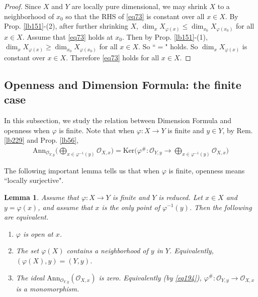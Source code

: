 \documentclass[12pt,b5paper,notitlepage]{report}
\theoremstyle{definition}
\theoremstyle{plain}
\newtheorem{lm}[df]{Lemma}
\newcommand{\scr}{\mathscr}
\newcommand{\Ker}{\mathrm{Ker}}
\newcommand{\Ann}{\mathrm{Ann}}
\numberwithin{equation}{section}
\begin{document}
\begin{proof}
Since $X$ and $Y$ are locally pure dimensional, we may shrink $X$ to a neighborhood of $x_0$ so that the RHS of \eqref{eq73} is constant over all $x\in X$. By Prop. \ref{lb151}-(2), after further shrinking $X$, $\dim_x X_{\varphi(x)}\leq \dim_{x_0} X_{\varphi(x_0)}$ for all $x\in X$. Assume that \eqref{eq73} holds at $x_0$. Then by Prop. \ref{lb151}-(1), $\dim_x X_{\varphi(x)}\geq \dim_{x_0} X_{\varphi(x_0)}$ for all $x\in X$. So ``$=$" holds. So $\dim_x X_{\varphi(x)}$ is constant over $x\in X$. Therefore \eqref{eq73} holds for all $x\in X$. 
\end{proof}
















\subsection{Openness and Dimension Formula: the finite case}



In this subsection, we study the relation between Dimension Formula and openness when $\varphi$ is finite. Note that when $\varphi:X\rightarrow Y$ is finite and $y\in Y$, by Rem. \ref{lb229} and Prop. \ref{lb56}, 
\begin{align}\label{eq194}
\Ann_{\scr O_{Y,y}}\Big(\bigoplus_{x\in\varphi^{-1}(y)}\scr O_{X,x}\Big)= \Ker\Big(\varphi^\#:\scr O_{Y,y}\rightarrow \bigoplus_{x\in\varphi^{-1}(y)}\scr O_{X,x} \Big)
\end{align}

The following important lemma tells us that when $\varphi$ is finite, openness means ``locally surjective".

\begin{lm}\label{lb156}
Assume that $\varphi:X\rightarrow Y$ is finite and $Y$ is reduced. Let $x\in X$ and $y=\varphi(x)$, and assume that $x$ is the only point of $\varphi^{-1}(y)$. Then the following are equivalent.
\begin{enumerate}[label=(\arabic*)]
\item $\varphi$ is open at $x$.
\item The set $\varphi(X)$ contains a neighborhood of $y$ in $Y$. Equivalently, $(\varphi(X),y)=(Y,y)$.
\item The ideal $\Ann_{\scr O_{Y,y}}(\scr O_{X,x})$ is zero. Equivalently (by \eqref{eq194}), $\varphi^\#:\scr O_{Y,y}\rightarrow\scr O_{X,x}$ is a monomorphism.
\end{enumerate}
\end{lm}
\end{document}
